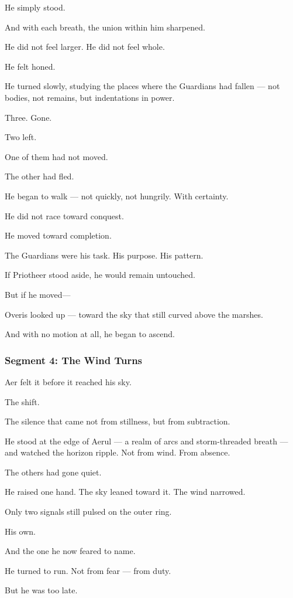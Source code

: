 \documentclass[9pt]{article}
\begin{document}
He simply stood.

And with each breath, the union within him sharpened.

He did not feel larger. He did not feel whole.

He felt honed.

He turned slowly, studying the places where the Guardians had fallen — not bodies, not remains, but indentations in power.

Three. Gone.

Two left.

One of them had not moved.

The other had fled.

He began to walk — not quickly, not hungrily. With certainty.

He did not race toward conquest.

He moved toward completion.

The Guardians were his task. His purpose. His pattern.

If Priotheer stood aside, he would remain untouched.

But if he moved—

Overis looked up — toward the sky that still curved above the marshes.

And with no motion at all, he began to ascend.

\newpage

\subsubsection*{Segment 4: The Wind Turns}

Aer felt it before it reached his sky.

The shift.

The silence that came not from stillness, but from subtraction.

He stood at the edge of Aerul — a realm of arcs and storm-threaded breath — and watched the horizon ripple. Not from wind. From absence.

The others had gone quiet.

He raised one hand. The sky leaned toward it. The wind narrowed.

Only two signals still pulsed on the outer ring.

His own.

And the one he now feared to name.

He turned to run. Not from fear — from duty.

But he was too late.
\end{document}

